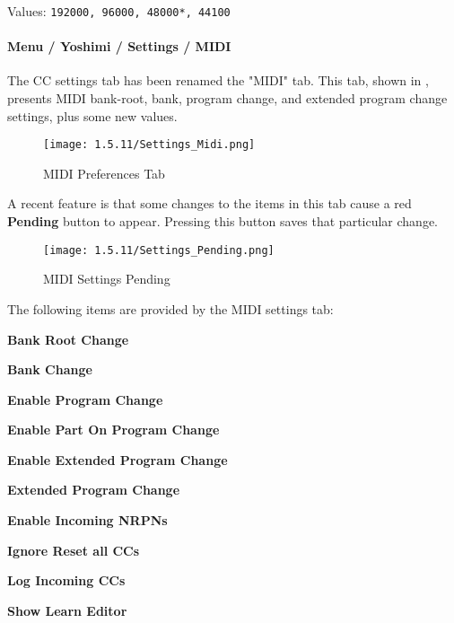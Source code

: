
   Values: \texttt{192000, 96000, 48000*, 44100}

\paragraph{Menu / Yoshimi / Settings / MIDI}
\label{paragraph:menu_yoshimi_settings_ccs}

   The CC settings tab has been renamed the "MIDI" tab.
   This tab, shown in
   ,
   presents MIDI bank-root, bank, program change, and extended program
   change settings, plus some new values.

\begin{figure}[H]
   \centering
   \texttt{[image: 1.5.11/Settings\_Midi.png]}
   \caption[MIDI Preferences]{MIDI Preferences Tab}
   \label{fig:yoshimi_settings_cc}
\end{figure}

   A recent feature is that some changes to the items in this
   tab cause a red \textbf{Pending} button to appear.  Pressing this
   button saves that particular change.

\begin{figure}[H]
   \centering
   \texttt{[image: 1.5.11/Settings\_Pending.png]}
   \caption[MIDI Settings Pending]{MIDI Settings Pending}
   \label{fig:yoshimi_settings_pending}
\end{figure}

   The following items are provided by the MIDI settings tab:

   \begin{enumber}
      \item \textbf{Bank Root Change}
      \item \textbf{Bank Change}
      \item \textbf{Enable Program Change}
      \item \textbf{Enable Part On Program Change}
      \item \textbf{Enable Extended Program Change}
      \item \textbf{Extended Program Change}
      \item \textbf{Enable Incoming NRPNs}
      \item \textbf{Ignore Reset all CCs}
      \item \textbf{Log Incoming CCs}
      \item \textbf{Show Learn Editor}
   \end{enumber}

